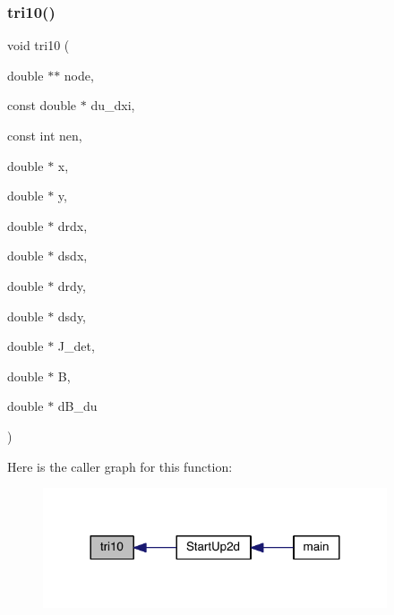 \subsubsection{\texorpdfstring{tri10()}{tri10()}}
{\footnotesize\ttfamily void tri10 (\begin{DoxyParamCaption}\item[{double $\ast$$\ast$}]{node,  }\item[{const double $\ast$}]{du\+\_\+dxi,  }\item[{const int}]{nen,  }\item[{double $\ast$}]{x,  }\item[{double $\ast$}]{y,  }\item[{double $\ast$}]{drdx,  }\item[{double $\ast$}]{dsdx,  }\item[{double $\ast$}]{drdy,  }\item[{double $\ast$}]{dsdy,  }\item[{double $\ast$}]{J\+\_\+det,  }\item[{double $\ast$}]{B,  }\item[{double $\ast$}]{d\+B\+\_\+du }\end{DoxyParamCaption})}

Here is the caller graph for this function\+:\nopagebreak
\begin{figure}[H]
\begin{center}
\leavevmode
\includegraphics[width=288pt]{a00599_a5f6af94f39daf53ff33c328e81b7aeae_icgraph}
\end{center}
\end{figure}
